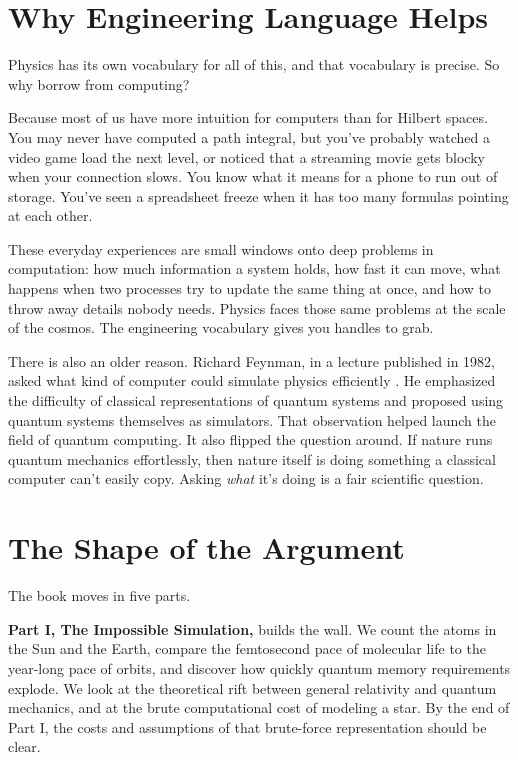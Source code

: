 \section{Why Engineering Language Helps}

Physics has its own vocabulary for all of this, and that vocabulary is precise. So why borrow from computing?

Because most of us have more intuition for computers than for Hilbert spaces. You may never have computed a path integral, but you've probably watched a video game load the next level, or noticed that a streaming movie gets blocky when your connection slows. You know what it means for a phone to run out of storage. You've seen a spreadsheet freeze when it has too many formulas pointing at each other.

These everyday experiences are small windows onto deep problems in computation: how much information a system holds, how fast it can move, what happens when two processes try to update the same thing at once, and how to throw away details nobody needs. Physics faces those same problems at the scale of the cosmos. The engineering vocabulary gives you handles to grab.

There is also an older reason. Richard Feynman, in a lecture published in 1982, asked what kind of computer could simulate physics efficiently \cite{feynman1982}. He emphasized the difficulty of classical representations of quantum systems and proposed using quantum systems themselves as simulators. That observation helped launch the field of quantum computing. It also flipped the question around. If nature runs quantum mechanics effortlessly, then nature itself is doing something a classical computer can't easily copy. Asking \emph{what} it's doing is a fair scientific question.

\section{The Shape of the Argument}

The book moves in five parts.

\textbf{Part I, The Impossible Simulation,} builds the wall. We count the atoms in the Sun and the Earth, compare the femtosecond pace of molecular life to the year-long pace of orbits, and discover how quickly quantum memory requirements explode. We look at the theoretical rift between general relativity and quantum mechanics, and at the brute computational cost of modeling a star. By the end of Part I, the costs and assumptions of that brute-force representation should be clear.

